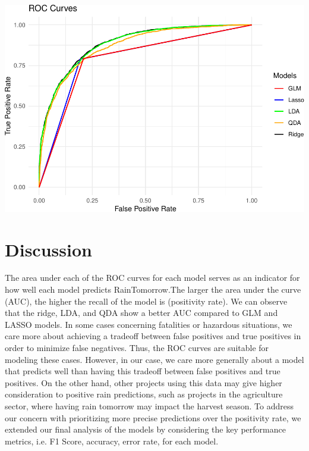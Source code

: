 \documentclass[
]{article}
\begin{document}
\includegraphics{Rain_Australia_files/figure-latex/ROC-1.pdf}

\hypertarget{discussion}{%
\section{Discussion}\label{discussion}}

The area under each of the ROC curves for each model serves as an
indicator for how well each model predicts RainTomorrow.The larger the
area under the curve (AUC), the higher the recall of the model is
(positivity rate). We can observe that the ridge, LDA, and QDA show a
better AUC compared to GLM and LASSO models. In some cases concerning
fatalities or hazardous situations, we care more about achieving a
tradeoff between false positives and true positives in order to minimize
false negatives. Thus, the ROC curves are suitable for modeling these
cases. However, in our case, we care more generally about a model that
predicts well than having this tradeoff between false positives and true
positives. On the other hand, other projects using this data may give
higher consideration to positive rain predictions, such as projects in
the agriculture sector, where having rain tomorrow may impact the
harvest season. To address our concern with prioritizing more precise
predictions over the positivity rate, we extended our final analysis of
the models by considering the key performance metrics, i.e. F1 Score,
accuracy, error rate, for each model.
\end{document}
